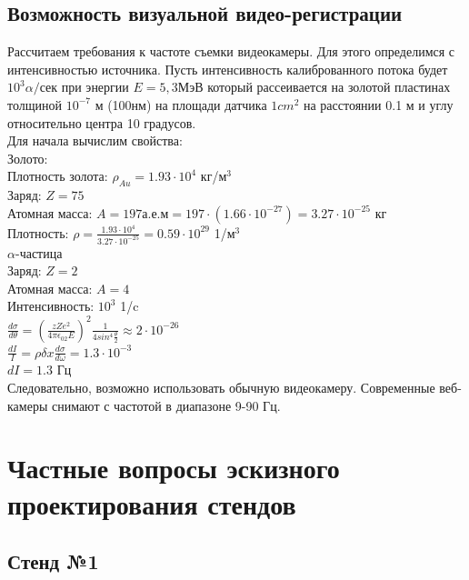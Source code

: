 \documentclass[11pt]{report}
\begin{document}
\section{Возможность визуальной видео-регистрации}
Рассчитаем требования к частоте съемки видеокамеры. Для этого определимся с интенсивностью источника. 
Пусть интенсивность калиброванного потока будет $10^3 \alpha / \text{сек} $ при энергии $E=5,3\text{МэВ} $ который рассеивается на золотой пластинах толщиной $10^{-7}$ м  (100нм) на площади датчика $ 1 cm^2 $ на расстоянии 0.1 м и углу относительно центра 10 градусов.\\

Для начала вычислим свойства: \\

Золото:\\
Плотность золота: $\rho_{Au} =1.93\cdot 10^4 $ кг/м$^3$ \\
Заряд: $Z=75$ \\
Атомная масса: $A=197а.е.м = 197 \cdot (1.66 \cdot 10^{-27}) = 3.27 \cdot 10^{-25} $ кг \\
Плотность: $\rho = \frac{1.93\cdot 10^4}{3.27 \cdot 10^{-25}} = 0.59\cdot 10^{29} $ 1/м$^3 $ \\

$\alpha$-частица \\
Заряд: $Z=2$ \\
Атомная масса: $A=4$ \\
Интенсивность: $10^3 $ 1/c \\

$ \frac{d\sigma}{d\theta}=(\frac{zZe^2}{4\pi \epsilon_02E})^2 \frac{1}{4sin^4\frac{\theta}{2}} \approx 2 \cdot 10^{-26}$ \\

$\frac{dI}{I} = \rho \delta x \frac{d\sigma}{d\omega} = 1.3 \cdot 10^{-3} $ \\

$dI = 1.3$ Гц \\

Следовательно, возможно использовать обычную видеокамеру. Современные веб-камеры снимают с частотой в диапазоне 9-90 Гц.

\chapter{Частные вопросы эскизного проектирования стендов }
\section{Стенд №1}
\end{document}
